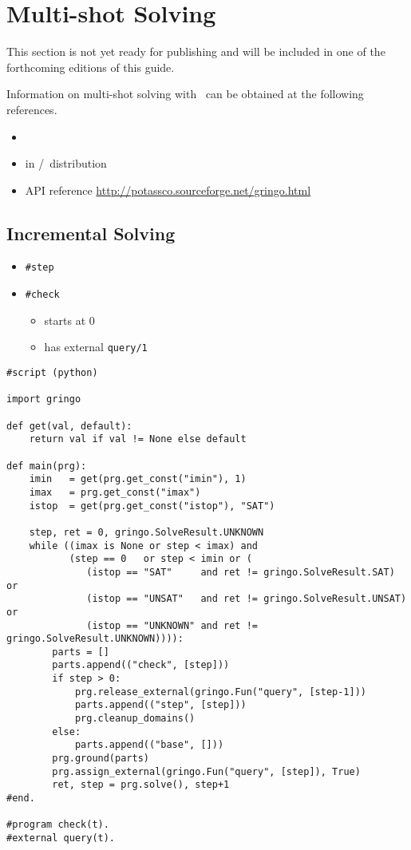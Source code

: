 \section{Multi-shot Solving}\label{sec:multi}

This section is not yet ready for publishing
and will be included in one of the forthcoming editions of this guide.

Information on multi-shot solving with \clingo\ can be obtained at the following references.

\begin{itemize}
\item \cite{gekakasc14b,gekaobsc15a}
\item {} in \gringo/\clingo\ distribution
\item API reference \url{http://potassco.sourceforge.net/gringo.html}
\end{itemize}

\subsection{Incremental Solving}
\label{sec:isolving}

\begin{itemize}
\item \lstinline{#step}
\item \lstinline{#check}
  \begin{itemize}
  \item starts at 0
  \item has external \lstinline{query/1}
  \end{itemize}
\end{itemize}

\begin{lstlisting}[caption={\lstinline{gringo/examples/clingo/iclingo/incmode-py.lp}}]
#script (python) 

import gringo

def get(val, default):
    return val if val != None else default

def main(prg):
    imin   = get(prg.get_const("imin"), 1)
    imax   = prg.get_const("imax")
    istop  = get(prg.get_const("istop"), "SAT")

    step, ret = 0, gringo.SolveResult.UNKNOWN
    while ((imax is None or step < imax) and
           (step == 0   or step < imin or (
              (istop == "SAT"     and ret != gringo.SolveResult.SAT) or
              (istop == "UNSAT"   and ret != gringo.SolveResult.UNSAT) or 
              (istop == "UNKNOWN" and ret != gringo.SolveResult.UNKNOWN)))):
        parts = []
        parts.append(("check", [step]))
        if step > 0:
            prg.release_external(gringo.Fun("query", [step-1]))
            parts.append(("step", [step]))
            prg.cleanup_domains()
        else:
            parts.append(("base", []))
        prg.ground(parts)
        prg.assign_external(gringo.Fun("query", [step]), True)
        ret, step = prg.solve(), step+1
#end.

#program check(t).
#external query(t).
\end{lstlisting}

